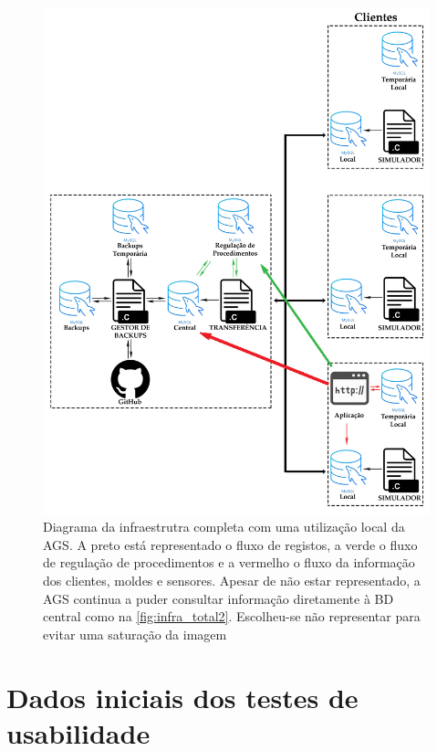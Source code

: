 \documentclass[11pt,twoside,a4paper]{report}
\begin{document}
\begin{figure}[H]
	\begin{center}
		\includegraphics[width=1\textwidth]{Esquema_Projeto_Total03} %
		\caption[Diagrama da infraestrutra completa com uma utilização local da aplicação de gestão do sistema]{Diagrama da infraestrutra completa com uma utilização local da AGS. A preto está representado o fluxo de registos, a verde o fluxo de regulação de procedimentos e a vermelho o fluxo da informação dos clientes, moldes e sensores. Apesar de não estar representado, a AGS continua a puder consultar informação diretamente à BD central como na \autoref{fig:infra_total2}. Escolheu-se não representar para evitar uma saturação da imagem}
		\label{fig:infra_total3}
	\end{center}
\end{figure}

\cleardoublepage
\chapter{Dados iniciais dos testes de usabilidade}
\label{apen:usabilidade}
\end{document}
